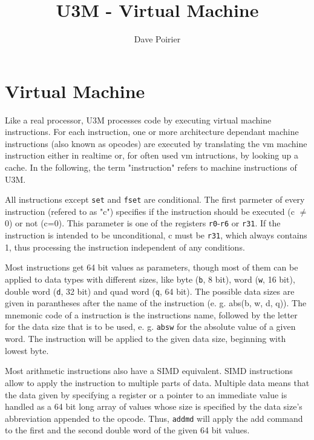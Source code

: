 \documentclass[letterpaper,10pt,openright,twoside,onecolumn]{book}
\begin{document}
\author{Dave Poirier}
\title{U3M - Virtual Machine}
\maketitle
\tableofcontents

\chapter{Virtual Machine}

Like a real processor, U3M processes code by executing virtual machine instructions. For each instruction, one or more architecture dependant machine instructions (also known as opcodes) are executed by translating the vm machine instruction either in realtime or, for often used vm intructions, by looking up a cache.
In the following, the term "instruction" refers to machine instructions of U3M.

All instructions except \texttt{set} and \texttt{fset} are conditional. The first parmeter of every instruction (refered to as "c") specifies if the instruction should be executed (c $\neq$ 0) or not (c=0). This parameter is one of the registers \texttt{r0}-\texttt{r6} or \texttt{r31}. If the instruction is intended to be unconditional, c must be \texttt{r31}, which always contains 1, thus processing the instruction independent of any conditions.

Most instructions get 64 bit values as parameters, though most of them can be applied to data types with different sizes, like byte (\texttt{b}, 8 bit), word (\texttt{w}, 16 bit), double word (\texttt{d}, 32 bit) and quad word (\texttt{q}, 64 bit). The possible data sizes are given in parantheses after the name of the instruction (e. g. abs(b, w, d, q)). The mnemonic code of a instruction is the instructions name, followed by the letter for the data size that is to be used, e. g. \texttt{absw} for the absolute value of a given word. The instruction will be applied to the given data size, beginning with lowest byte.

Most arithmetic instructions also have a SIMD equivalent. SIMD instructions allow to apply the instruction to multiple parts of data. Multiple data means that the data given by specifying a register or a pointer to an immediate value is handled as a 64 bit long array of values whose size is specified by the data size's abbreviation appended to the opcode. Thus, \texttt{addmd} will apply the add command to the first and the second double word of the given 64 bit values.
\end{document}

